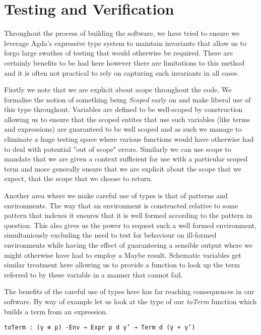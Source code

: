 \chapter{Testing and Verification}
\label{chapter-testing}

Throughout the process of building the software, we have tried to
ensure we leverage Agda's expressive type system to maintain
invariants that allow us to forgo large swathes of testing that would
otherwise be required. There are certainly benefits to be had here
however there are limitations to this method and it is often not
practical to rely on capturing such invariants in all cases.

Firstly we note that we are explicit about scope throughout the
code. We formalise the notion of something being \emph{Scoped} early
on and make liberal use of this type throughout. Variables are defined
to be well-scoped by construction allowing 
us to ensure that the scoped entites that use such variables (like
terms and expressions) are guaranteed to be well scoped and as such we
manage to eliminate a huge testing space where various functions would
have otherwise had to deal with potential "out of scope"
errors. Similarly we can use scope to mandate that we are given a
context sufficient for use with a particular scoped term and more
generally ensure that we are explicit about the scope that we expect,
that the scope that we choose to return.

Another area where we make careful use of types is that of patterns
and environments. The way that an environment is
constructed relative to some pattern that indexes it ensures that it
is well formed according to the pattern in question. This also gives
us the power to request such a well formed environment, simultaniously
excluding the need to test for behaviour on ill-formed environments
while having the effect of guaranteeing a sensible output where we
might otherwise have had to employ a Maybe result. Schematic variables
get similar treatment here allowing us to provide a function to look
up the term referred to by these variable in a manner that cannot
fail. 

The benefits of the careful use of types here has far reaching
consequences in our software. By way of example let us look at the
type of our \emph{toTerm} function which builds a term from an expression.

\begin{verbatim}
toTerm : (γ ⊗ p) -Env → Expr p d γ’ → Term d (γ + γ’)
\end{verbatim}

